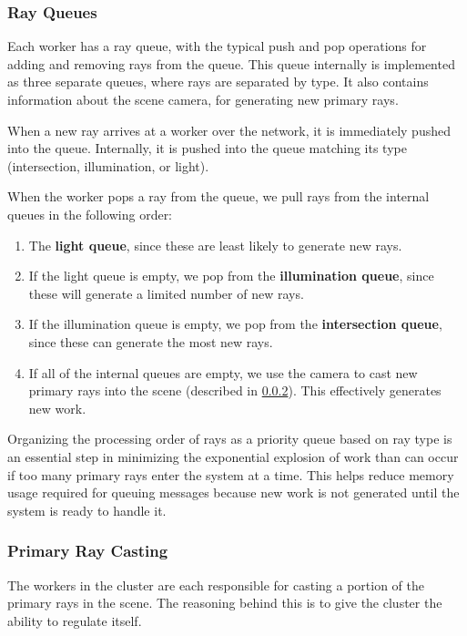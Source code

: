\documentclass[a4paper,twoside]{article}
\begin{document}
\subsubsection {Ray Queues}
\label{queues}

Each worker has a ray queue, with the typical push and pop operations for adding
and removing rays from the queue. This queue internally is implemented as three
separate queues, where rays are separated by type. It also contains information
about the scene camera, for generating new primary rays.

When a new ray arrives at a worker over the network, it is immediately pushed
into the queue. Internally, it is pushed into the queue matching its type
(intersection, illumination, or light).

When the worker pops a ray from the queue, we pull rays from the internal
queues in the following order:

\begin{enumerate}
   \item The \textbf{light queue}, since these are least likely to generate
      new rays.
   \item If the light queue is empty, we pop from the \textbf{illumination queue},
      since these will generate a limited number of new rays.
   \item If the illumination queue is empty, we pop from the
      \textbf{intersection queue}, since these can generate the most new rays.
   \item If all of the internal queues are empty, we use the camera to cast
      new primary rays into the scene (described in \ref{primaryrays}). This
      effectively generates new work.
\end{enumerate}

Organizing the processing order of rays as a priority queue based on ray type
is an essential step in minimizing the exponential explosion of work than can
occur if too many primary rays enter the system at a time. This helps reduce
memory usage required for queuing messages because new work is not generated
until the system is ready to handle it.

\subsubsection{Primary Ray Casting}
\label{primaryrays}

The workers in the cluster are each responsible for casting a portion of the
primary rays in the scene. The reasoning behind this is to give the cluster
the ability to regulate itself.
\end{document}
